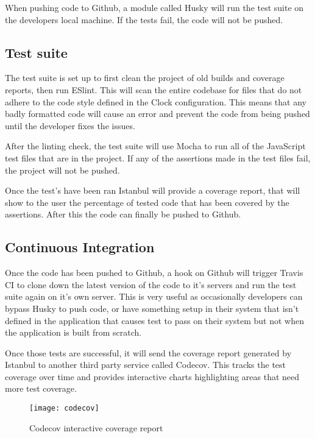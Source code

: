     When pushing code to Github, a module called Husky\cite{husky} will run the test suite on the developers local machine. If the tests fail, the code will not be pushed.

  \subsection{Test suite}
    The test suite is set up to first clean the project of old builds and coverage reports, then run ESlint\cite{eslint}. This will scan the entire codebase for files that do not adhere to the code style defined in the Clock configuration. This means that any badly formatted code will cause an error and prevent the code from being pushed until the developer fixes the issues. 

    After the linting check, the test suite will use Mocha\cite{mocha} to run all of the JavaScript test files that are in the project. If any of the assertions made in the test files fail, the project will not be pushed. 

    Once the test's have been ran Istanbul\cite{istanbul} will provide a coverage report, that will show to the user the percentage of tested code that has been covered by the assertions. After this the code can finally be pushed to Github. 
    
  \subsection{Continuous Integration}
    Once the code has been pushed to Github, a hook on Github will trigger Travis CI\cite{travis} to clone down the latest version of the code to it's servers and run the test suite again on it's own server. This is very useful as occasionally developers can bypass Husky to push code, or have something setup in their system that isn't defined in the application that causes test to pass on their system but not when the application is built from scratch. 

    Once those tests are successful, it will send the coverage report generated by Istanbul to another third party service called Codecov\cite{codecov}. This tracks the test coverage over time and provides interactive charts highlighting areas that need more test coverage. 

\begin{figure}[H]
\begin{center}
\texttt{[image: codecov]}
\caption{Codecov interactive coverage report}
\end{center}
\end{figure}



